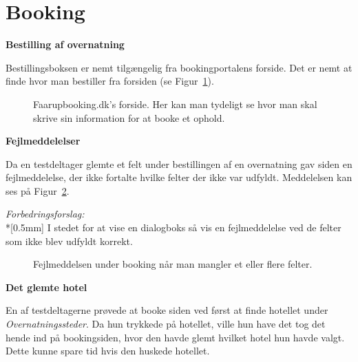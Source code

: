 \documentclass[10pt,a4paper]{article}      %
\newcommand{\kommentar}[2]{\item[#1] \textbf{#2}\par\nopagebreak}{}
\newenvironment{forslag}{\emph{Forbedringsforslag:}\\*[0.5mm]}{}
\newcommand\pic[1]{\texttt{[image: Pics/\#1]}}
\renewcommand\good{\pic{good}}
\renewcommand\goodidea{\pic{goodidea}}
\renewcommand\smallproblem{\pic{smallproblem}}
\begin{document}
\section{Booking}
\begin{kommentarer}
\kommentar{\good}{Bestilling af overnatning}

Bestillingsboksen er nemt tilgængelig fra bookingportalens forside. Det er nemt
at finde hvor man bestiller fra forsiden (se Figur~\ref{fig:forsidebooking}). 


\begin{figure}[htbp]
    \centering
    \caption{Faarupbooking.dk's forside. Her kan man tydeligt se hvor man skal
    skrive sin information for at booke et ophold.}
    \label{fig:forsidebooking}
\end{figure}

\kommentar{\smallproblem}{Fejlmeddelelser}

Da en testdeltager glemte et felt under bestillingen af en overnatning gav siden
en fejlmeddelelse, der ikke fortalte hvilke felter der ikke var udfyldt.
Meddelelsen kan ses på Figur~\ref{fig:fejlmeddelelsebooking}.

\begin{forslag}
I stedet for at vise en dialogboks så vis en fejlmeddelelse ved de felter som ikke blev
udfyldt korrekt.
\end{forslag}

\begin{figure}[htbp]
    \centering
    \caption{Fejlmeddelsen under booking når man mangler et eller flere felter.}
    \label{fig:fejlmeddelelsebooking}
\end{figure}

\kommentar{\goodidea}{Det glemte hotel}

En af testdeltagerne prøvede at booke siden ved først at finde hotellet under
\emph{Overnatningssteder}. Da hun trykkede på hotellet, ville hun have det tog det hende
ind på bookingsiden, hvor den havde glemt hvilket hotel hun havde valgt. Dette
kunne spare tid hvis den huskede hotellet.

\end{kommentarer}
\end{document}
